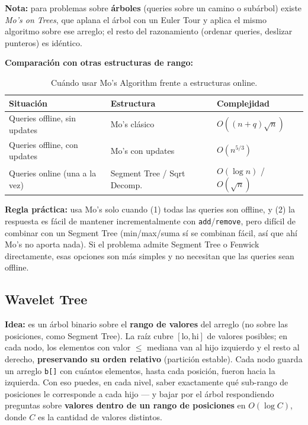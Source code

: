 \documentclass[10pt,a4paper,twocolumn]{article}
\begin{document}
\textbf{Nota:} para problemas sobre \textbf{árboles} (queries sobre
un camino o subárbol) existe \emph{Mo's on Trees}, que aplana el
árbol con un Euler Tour y aplica el mismo algoritmo sobre ese
arreglo; el resto del razonamiento (ordenar queries, deslizar
punteros) es idéntico.

\textbf{Comparación con otras estructuras de rango:}

\begin{table}[H]
\raggedright
\scriptsize
\setlength{\tabcolsep}{3pt}
\renewcommand{\arraystretch}{1.1}
\begin{tabular}{|p{}|p{}|p{}|}
\hline
\textbf{Situación} & \textbf{Estructura} & \textbf{Complejidad} \\
\hline
Queries offline, sin updates &
Mo's clásico &
$O((n+q)\sqrt{n})$ \\
\hline
Queries offline, con updates &
Mo's con updates &
$O(n^{5/3})$ \\
\hline
Queries online (una a la vez) &
Segment Tree / Sqrt Decomp. &
$O(\log n)$ / $O(\sqrt{n})$ \\
\hline
\end{tabular}
\caption{Cuándo usar Mo's Algorithm frente a estructuras online.}
\end{table}

\textbf{Regla práctica:} usa Mo's solo cuando (1) todas las queries
son offline, y (2) la respuesta es fácil de mantener
incrementalmente con \texttt{add}/\texttt{remove}, pero difícil de
combinar con un Segment Tree (min/max/suma sí se combinan fácil, así
que ahí Mo's no aporta nada). Si el problema admite Segment Tree o
Fenwick directamente, esas opciones son más simples y no necesitan
que las queries sean offline.

\subsection{Wavelet Tree}

\textbf{Idea:} es un árbol binario sobre el \textbf{rango de valores}
del arreglo (no sobre las posiciones, como Segment Tree). La raíz
cubre $[\text{lo},\text{hi}]$ de valores posibles; en cada nodo, los
elementos con valor $\le$ mediana van al hijo izquierdo y el resto al
derecho, \textbf{preservando su orden relativo} (partición estable).
Cada nodo guarda un arreglo \texttt{b[]} con cuántos elementos, hasta
cada posición, fueron hacia la izquierda. Con eso puedes, en cada
nivel, saber exactamente qué sub-rango de posiciones le corresponde a
cada hijo — y bajar por el árbol respondiendo preguntas sobre
\textbf{valores dentro de un rango de posiciones} en $O(\log C)$,
donde $C$ es la cantidad de valores distintos.
\end{document}
